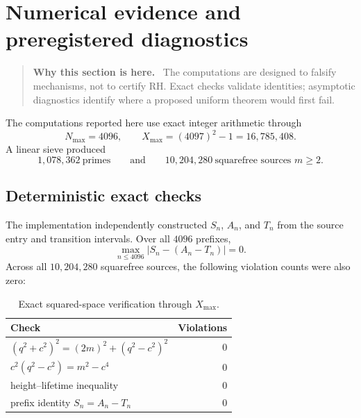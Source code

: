 \documentclass[11pt]{article}
\theoremstyle{definition}
\theoremstyle{remark}
\newcommand{\1}{\mathbf{1}}
\newenvironment{motivation}
  {\begin{quote}\small\color{ovvogray}\textbf{Why this section is here.}\ }
  {\end{quote}}
\begin{document}
\section{Numerical evidence and preregistered diagnostics}
\label{sec:numerics}

\begin{motivation}
The computations are designed to falsify mechanisms, not to certify RH.  Exact checks validate identities; asymptotic diagnostics identify where a proposed uniform theorem would first fail.
\end{motivation}

The computations reported here use exact integer arithmetic through
\begin{equation}
 N_{\max}=4096,
 \qquad
 X_{\max}=(4097)^2-1=16{,}785{,}408.
 \label{eq:numerical-range}
\end{equation}
A linear sieve produced
\begin{equation}
 1{,}078{,}362\ \text{primes}
 \qquad\text{and}\qquad
 10{,}204{,}280\ \text{squarefree sources }m\ge2.
 \label{eq:numerical-counts}
\end{equation}

\subsection{Deterministic exact checks}

The implementation independently constructed $S_n$, $A_n$, and $T_n$
from the source entry and transition intervals.  Over all $4096$
prefixes,
\begin{equation}
 \max_{n\le4096}|S_n-(A_n-T_n)|=0.
 \label{eq:exact-AT-numerical}
\end{equation}
Across all $10{,}204{,}280$ squarefree sources, the following violation
counts were also zero:

\begin{table}[htbp]
\centering
\caption{Exact squared-space verification through $X_{\max}$.}
\label{tab:exact-checks}
\small
\begin{tabular}{lr}
\toprule
Check & Violations\\
\midrule
$(q^2+c^2)^2=(2m)^2+(q^2-c^2)^2$ & 0\\
$c^2(q^2-c^2)=m^2-c^4$ & 0\\
height--lifetime inequality & 0\\
prefix identity $S_n=A_n-T_n$ & 0\\
\bottomrule
\end{tabular}
\end{table}
\end{document}

